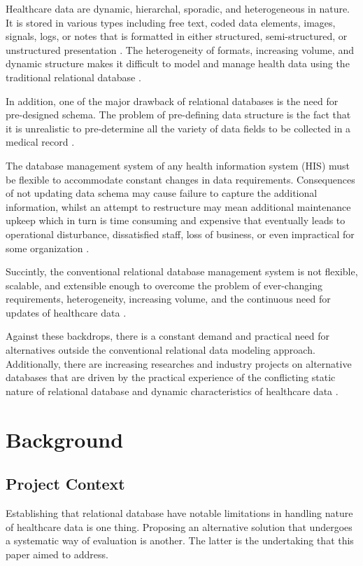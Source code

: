 \documentclass[5p]{elsarticle}
\begin{document}
Healthcare data are dynamic, hierarchal, sporadic, and heterogeneous in nature. 
It is stored in various types including free text, coded data elements, images, signals, logs, or notes that is formatted in either structured, semi-structured, 
or unstructured presentation \cite{M.Ercan190510,K.Lee201299,C.S.Kruse201638,S.White201413,S.Wasan1192016}.
The heterogeneity of formats, increasing volume, and dynamic structure makes it difficult to model and manage health 
data using the traditional relational database \cite{K.Lee201299,H.Al-Fatlawi2015122,O.Schmitt20121,Y.Jin2011288}.

In addition, one of the major drawback of relational databases is the need for pre-designed schema. The problem of pre-defining
data structure is the fact that it is unrealistic to pre-determine all the variety of data fields to be collected in a medical record \cite{K.Lee201299}. 

The database management system of any health information system (HIS) must be flexible to accommodate constant changes in data requirements. 
Consequences of not updating data schema may cause failure to capture the additional information, whilst an attempt to restructure
may mean additional maintenance upkeep which in turn is time consuming and expensive that eventually leads to operational disturbance, 
dissatisfied staff, loss of business, or even impractical for some organization \cite{H.Al-Fatlawi2015122,V.Manoj201411,J.Gilchrist20113244}. 

Succintly, the conventional relational database management system is not flexible, scalable, and extensible enough to overcome the problem of 
ever-changing requirements, heterogeneity, increasing volume, and the continuous need for updates of healthcare data \cite{Z.Goli-Malekabadi201675,K.Lee201299,H.Al-Fatlawi2015122,O.Schmitt20121,Y.Jin2011288}.

Against these backdrops, there is a constant demand and practical need for alternatives outside the conventional relational data modeling approach. 
Additionally, there are increasing researches and industry projects on alternative databases that are driven by the practical experience of the conflicting static 
nature of relational database and dynamic characteristics of healthcare data \cite{M.Ercan190510}.

\section{Background}
\subsection{Project Context}
Establishing that relational database have notable limitations in handling nature of healthcare data \cite{Z.Goli-Malekabadi201675,K.Lee201299,H.Al-Fatlawi2015122,O.Schmitt20121,Y.Jin2011288} is one thing. 
Proposing an alternative solution that undergoes a systematic way of evaluation is another. The latter is the undertaking that this paper aimed to address.
\end{document}
